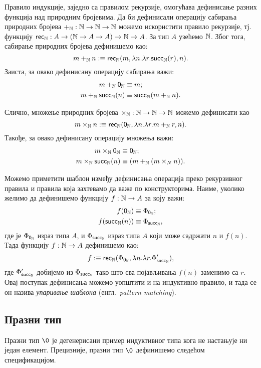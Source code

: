 \documentclass[12pt,oneside]{memoir}
\begin{document}
Правило индукције, заједно са правилом рекурзије, омогућава дефинисање разних функција над природним бројевима. Да би дефинисали операцију сабирања природних бројева $+_{{\mathbb{N}}} : {\mathbb{N}} \to {\mathbb{N}} \to {\mathbb{N}}$ можемо искористити правило рекурзије, тј. функцију $\mathsf{rec}_{{\mathbb{N}}}: A \to ({\mathbb{N}} \to A \to A) \to {\mathbb{N}} \to A$. За тип $A$ узећемо ${\mathbb{N}}$. Због тога, сабирање природних бројева дефинишемо као:
\[m +_{{\mathbb{N}}} n :\equiv \mathsf{rec}_{{\mathbb{N}}} (m, \lambda n.\lambda r.\mathsf{succ}_\mathbb{N}(r), n).\] 
Заиста, за овако дефинисану операцију сабирања важи:
\begin{align*}
    m +_{{\mathbb{N}}} \mathsf{0}_\mathbb{N}{} &\equiv{} m; \\
    m +_{{\mathbb{N}}} \mathsf{succ}_\mathbb{N}(n) &\equiv{} \mathsf{succ}_\mathbb{N}(m +_{{\mathbb{N}}} n).
\end{align*}

Слично, множење природних бројева $\times_{{\mathbb{N}}} : {\mathbb{N}} \to {\mathbb{N}} \to {\mathbb{N}}$ можемо дефинисати као 
\[m \times_{{\mathbb{N}}} n :\equiv \mathsf{rec}_{{\mathbb{N}}} (\mathsf{0}_\mathbb{N}, \lambda n.\lambda r.m +_{{\mathbb{N}}} r, n).\] 
Такође, за овако дефинисану операцију множења важи:
\begin{align*}
    m \times_{{\mathbb{N}}} \mathsf{0}_\mathbb{N}{} &\equiv{} \mathsf{0}_\mathbb{N}{}; \\
    m \times_{{\mathbb{N}}} \mathsf{succ}_\mathbb{N}(n) &\equiv{} (m +_{{\mathbb{N}}} (m \times_{N} n)).
\end{align*}

Можемо приметити шаблон између дефинисања операција преко рекурзивног правила и правила која захтевамо да важе по конструкторима. Наиме, уколико желимо да дефинишемо функцију $f : {\mathbb{N}} \to A$ за коју важи:
\begin{align*}
    f (\mathsf{0}_\mathbb{N}) &\equiv{} \Phi_{\mathsf{0}_\mathbb{N}}; \\
    f (\mathsf{succ}_\mathbb{N}(n)) &\equiv{} \Phi_{\mathsf{succ}_\mathbb{N}},
\end{align*}
где је $\Phi_{\mathsf{0}_\mathbb{N}}$ израз типа $A$, и $\Phi_{\mathsf{succ}_\mathbb{N}}$ израз типа $A$ који може садржати $n$ и $f(n)$. Тада функцију $f : {\mathbb{N}} \to A$ дефинишемо као: 
\[f :\equiv \mathsf{rec}_{{\mathbb{N}}} ({\Phi}_{\mathsf{0}_\mathbb{N}}, \lambda n. \lambda r. \Phi_{\mathsf{succ}_\mathbb{N}}'),\] 
где $\Phi_{\mathsf{succ}_\mathbb{N}}'$ добијемо из $\Phi_{\mathsf{succ}_\mathbb{N}}$ тако што сва појављивања $f(n)$ заменимо са $r$. Овај поступак дефинисања можемо уопштити и на индуктивно правило, и тада се он назива \emph{упаривање шаблона} (енгл.~\emph{pattern matching}).

\subsection{Празни тип}

Празни тип $\0$ је дегенерисани пример индуктивног типа кога не настањује ни један елемент. Прецизније, празни тип $\0$ дефинишемо следећом спецификацијом.
\end{document}

